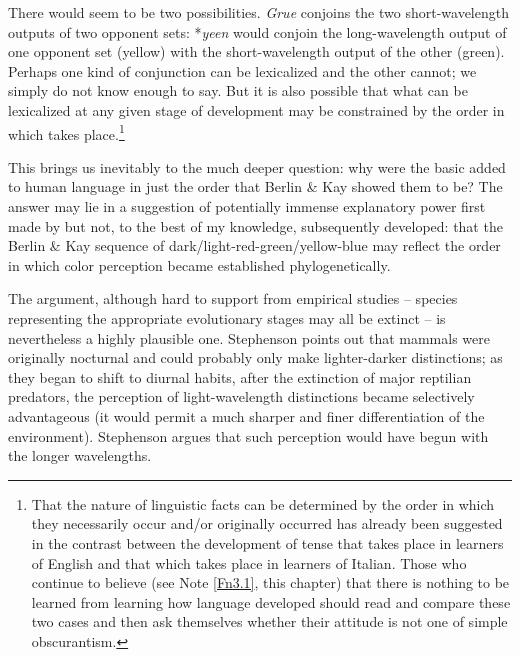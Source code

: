 There would seem to be two possibilities. \textit{Grue} conjoins the two short-wave\-length outputs of two opponent sets: *\textit{yeen} would conjoin the long-wavelength output of one opponent set (yellow) with the short-wavelength output of the other (green). Perhaps one kind of conjunction can be lexicalized and the other cannot; we simply do not know enough to say. But it is also possible that what can be lexicalized at any given stage of development may be constrained by the order in which  takes place.\footnote{That the nature of linguistic facts can be determined by the order in which they necessarily occur and/or originally occurred has already been suggested in the contrast between the development of tense that takes place in learners of English and that which takes place in learners of Italian. Those who continue to believe (see Note \ref{Fn3.1}, this chapter) that there is nothing to be learned from learning how language developed should read and compare these two cases and then ask themselves whether their attitude is not one of simple obscurantism.}

This brings us inevitably to the much deeper question: why were the basic  added to human language in just the order that Berlin \& Kay showed them to be? The answer may lie in a suggestion of potentially immense explanatory power first made by \citet{Stephenson1973} but not, to the best of my knowledge, subsequently developed: that the Berlin \& Kay sequence of dark/light-red-green/yellow-blue may reflect the order in which color perception became established phylogenetically.

The argument, although hard to support from empirical studies -- species representing the appropriate evolutionary stages may all be extinct -- is nevertheless a highly plausible one. Stephenson points out that mammals were originally nocturnal and could probably only make lighter-darker distinctions; as they began to shift to diurnal habits, after the extinction of major reptilian predators, the perception of light-wavelength distinctions became selectively advantageous (it
would permit a much sharper and finer differentiation of the environment). Stephenson argues that such perception would have begun with the longer wavelengths.

